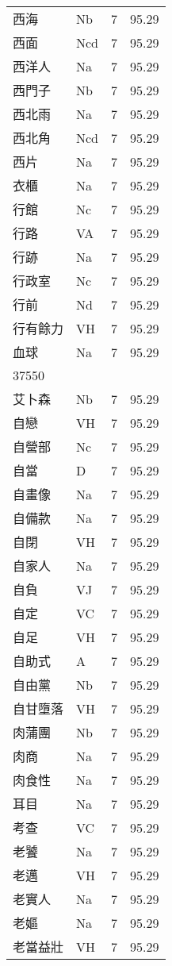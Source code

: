\documentclass[twocolumn]{book}
\begin{document}
\begin{supertabular}{llrr}
西海 & Nb & 7 &  95.29\\
西面 & Ncd & 7 &  95.29\\
西洋人 & Na & 7 &  95.29\\
西門子 & Nb & 7 &  95.29\\
西北雨 & Na & 7 &  95.29\\
西北角 & Ncd & 7 &  95.29\\
西片 & Na & 7 &  95.29\\
衣櫃 & Na & 7 &  95.29\\
行館 & Nc & 7 &  95.29\\
行路 & VA & 7 &  95.29\\
行跡 & Na & 7 &  95.29\\
行政室 & Nc & 7 &  95.29\\
行前 & Nd & 7 &  95.29\\
行有餘力 & VH & 7 &  95.29\\
血球 & Na & 7 &  95.29\\
37550\\
艾卜森 & Nb & 7 &  95.29\\
自戀 & VH & 7 &  95.29\\
自營部 & Nc & 7 &  95.29\\
自當 & D & 7 &  95.29\\
自畫像 & Na & 7 &  95.29\\
自備款 & Na & 7 &  95.29\\
自閉 & VH & 7 &  95.29\\
自家人 & Na & 7 &  95.29\\
自負 & VJ & 7 &  95.29\\
自定 & VC & 7 &  95.29\\
自足 & VH & 7 &  95.29\\
自助式 & A & 7 &  95.29\\
自由黨 & Nb & 7 &  95.29\\
自甘墮落 & VH & 7 &  95.29\\
肉蒲團 & Nb & 7 &  95.29\\
肉商 & Na & 7 &  95.29\\
肉食性 & Na & 7 &  95.29\\
耳目 & Na & 7 &  95.29\\
考查 & VC & 7 &  95.29\\
老饕 & Na & 7 &  95.29\\
老邁 & VH & 7 &  95.29\\
老實人 & Na & 7 &  95.29\\
老嫗 & Na & 7 &  95.29\\
老當益壯 & VH & 7 &  95.29\\

\end{supertabular}
\end{document}
